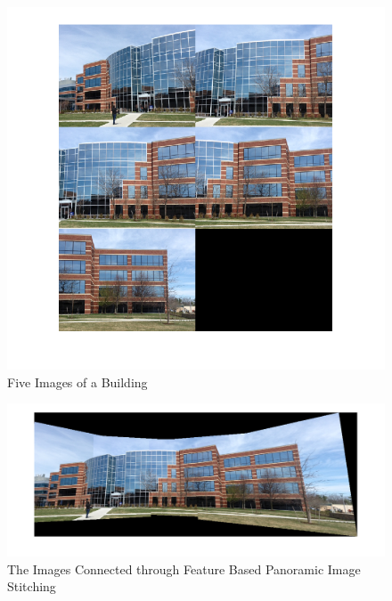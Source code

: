 \begin{figure}
\begin{center}
\includegraphics[width=0.8\columnwidth]{figures/vision2.png}
\end{center}
\caption{Five Images of a Building}
\label{fig:vision1}
\end{figure}
  
\begin{figure}
\begin{center}
\includegraphics[width=\columnwidth]{figures/vision3.png}
\end{center}
\caption{The Images Connected through Feature Based Panoramic Image Stitching}
\label{fig:vision2}
\end{figure}